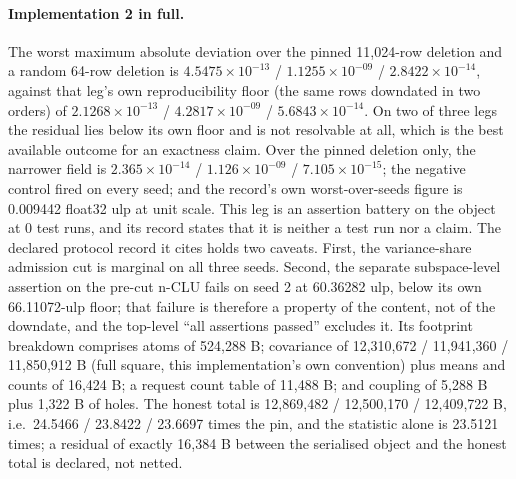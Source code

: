 \documentclass{article} %
\newcommand{\sci}[2]{\ensuremath{#1\times10^{#2}}}
\begin{document}
\paragraph{Implementation 2 in full.} The worst maximum absolute deviation over the pinned
11,024-row deletion and a random 64-row deletion is \sci{4.5475}{-13} / \sci{1.1255}{-09} /
\sci{2.8422}{-14}, against that leg's own reproducibility floor (the same rows downdated in two
orders) of \sci{2.1268}{-13} / \sci{4.2817}{-09} / \sci{5.6843}{-14}. On two of three legs the
residual lies below its own floor and is not resolvable at all, which is the best available outcome
for an exactness claim. Over the pinned deletion only, the narrower field is \sci{2.365}{-14} /
\sci{1.126}{-09} / \sci{7.105}{-15}; the negative control fired on every seed; and the record's
own worst-over-seeds figure is 0.009442 float32 ulp at unit scale. %
This leg is an assertion battery on the object at 0 test runs, and its record states that it is
neither a test run nor a claim. The declared protocol record it cites holds two caveats. First, the variance-share
admission cut is marginal on all three seeds. Second, the separate subspace-level assertion on the
pre-cut n-CLU fails on seed 2 at 60.36282 ulp, below its own 66.11072-ulp floor; that failure is
therefore a property of the content, not of the downdate, and the top-level ``all assertions
passed'' excludes it. %
Its footprint breakdown comprises atoms of 524,288 B; covariance of 12,310,672 / 11,941,360 /
11,850,912 B (full square, this implementation's own convention) plus means and counts of 16,424
B; a request count table of 11,488 B; and coupling of 5,288 B plus 1,322 B of holes. The honest
total is 12,869,482 / 12,500,170 / 12,409,722 B, i.e.\ 24.5466 / 23.8422 / 23.6697 times the pin,
and the statistic alone is 23.5121 times; a residual of exactly 16,384 B between the serialised %
object and the honest total is declared, not netted. %
\end{document}
